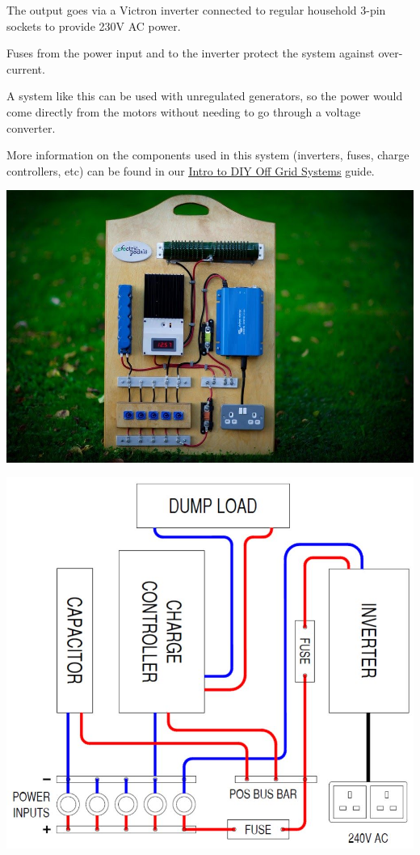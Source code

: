 \documentclass{article}
\theoremstyle{definition}
\theoremstyle{definition}
\theoremstyle{remark}
\begin{document}
    The output goes via a Victron inverter connected to regular household 3-pin sockets to provide 230V AC power. 

    Fuses from the power input and to the inverter protect the system against over-current.

    A system like this can be used with unregulated generators, so the power would come directly from the motors without needing to go through a voltage converter. 

    More information on the components used in this system (inverters, fuses, charge controllers, etc) can be found in our \href{https://www.demandenergyequality.org/get-started-with-offgrid}{\underline{Intro to DIY Off Grid Systems}} guide.
    
    \begin{center}
      \includegraphics[width=0.35\paperwidth]{../Images/image_5_4_(example_board).png}
    \end{center}

    \begin{center}
      \includegraphics[width=0.35\paperwidth]{Images/image_5_5_(example_diagram).png}
    \end{center}
\end{document}
